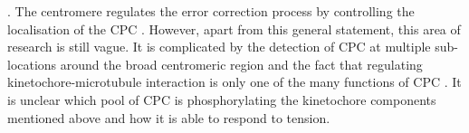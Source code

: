 \citep{Andrews2004AuroraCentromere, Lan2004AuroraActivity}. The centromere regulates the error correction process by controlling the localisation of the CPC \citep{McVey2021AuroraSegregation}. However, apart from this general statement, this area of research is still vague. It is complicated by the detection of CPC at multiple sub-locations around the broad centromeric region \citep{Liang2020Centromere-localizedSegregation, Fuller2008MidzoneGradient, Hadders2020UntanglingMitosis, Broad2020AuroraCells} and the fact that regulating kinetochore-microtubule interaction is only one of the many functions of CPC \citep{Hengeveld2017InnerSilencing, Afonso2019SpatiotemporalCrosstalk, Liang2020Centromere-localizedSegregation, Hadders2020UntanglingMitosis, Broad2020AuroraCells}. It is unclear which pool of CPC is phosphorylating the kinetochore components mentioned above and how it is able to respond to tension. 

